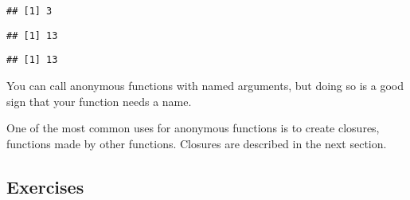 \begin{verbatim}
## [1] 3
\end{verbatim}

\begin{Shaded}
\begin{Highlighting}[]
\NormalTok{(}\OperatorTok{+}\StringTok{ }\NormalTok{)(}\NormalTok{)}
\end{Highlighting}
\end{Shaded}

\begin{verbatim}
## [1] 13
\end{verbatim}

\begin{Shaded}
\begin{Highlighting}[]
\StringTok{ }\OperatorTok{+}\StringTok{ }
\NormalTok{(}\NormalTok{)}
\end{Highlighting}
\end{Shaded}

\begin{verbatim}
## [1] 13
\end{verbatim}

You can call anonymous functions with named arguments, but doing so is a
good sign that your function needs a name.

One of the most common uses for anonymous functions is to create
closures, functions made by other functions. Closures are described in
the next section.

\hypertarget{exercises}{%
\subsection{Exercises}\label{exercises}}

